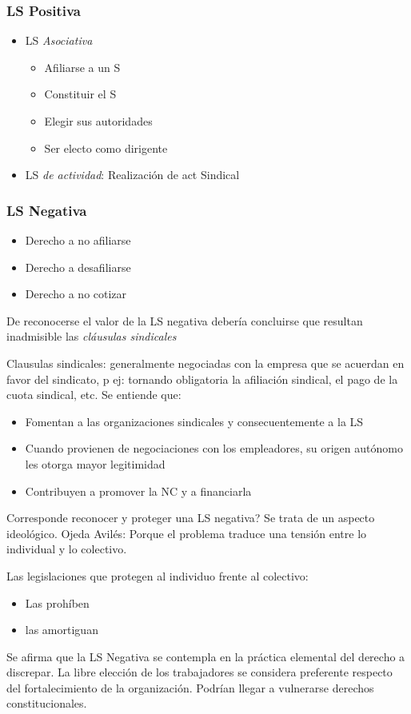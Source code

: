 \documentclass[spanish,12pt,a4paper,titlepage]{report}
\begin{document}
\subsubsection{LS Positiva}

\begin{itemize}
\item LS \textit{Asociativa}
	\begin{itemize}
	\item Afiliarse a un S
	\item Constituir el S
	\item Elegir sus autoridades
	\item Ser electo como dirigente
	\end{itemize}
\item LS \textit{de actividad}: Realización de act Sindical
\end{itemize}

\subsubsection{LS Negativa}
\begin{itemize}
\item Derecho a no afiliarse
\item Derecho a desafiliarse
\item Derecho a no cotizar
\end{itemize}

De reconocerse el valor de la LS negativa debería concluirse que resultan inadmisible las \textit{cláusulas sindicales}

Clausulas sindicales: generalmente negociadas con la empresa que se acuerdan en favor del sindicato, p ej: tornando obligatoria la afiliación sindical, el pago de la cuota sindical, etc.
Se entiende que:
\begin{itemize}
\item Fomentan a las organizaciones sindicales y consecuentemente a la LS
\item Cuando provienen de negociaciones con los empleadores, su origen autónomo les otorga mayor legitimidad
\item Contribuyen a promover la NC y a financiarla
\end{itemize}

Corresponde reconocer y proteger una LS negativa? Se trata de un aspecto ideológico. Ojeda Avilés: Porque el problema traduce una tensión entre lo individual y lo colectivo.

Las legislaciones que protegen al individuo frente al colectivo:
\begin{itemize}
\item Las prohíben
\item las amortiguan
\end{itemize}
Se afirma que la LS Negativa se contempla en la práctica elemental del derecho a discrepar. La libre elección de los trabajadores se considera preferente respecto del fortalecimiento de la organización. Podrían llegar a vulnerarse derechos constitucionales.
\end{document}

